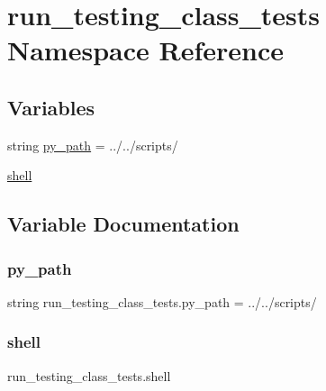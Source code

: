 \hypertarget{namespacerun__testing__class__tests}{}\section{run\+\_\+testing\+\_\+class\+\_\+tests Namespace Reference}
\label{namespacerun__testing__class__tests}
\subsection*{Variables}
\begin{DoxyCompactItemize}
\item 
string \hyperlink{namespacerun__testing__class__tests_adb8ad064c0b817b013e22c052fbc1a60}{py\+\_\+path} = \textquotesingle{}../../scripts/\textquotesingle{}
\item 
\hyperlink{namespacerun__testing__class__tests_a86332c96200dc5ef2e99580ea6b48ca9}{shell}
\end{DoxyCompactItemize}


\subsection{Variable Documentation}
\mbox{\label{namespacerun__testing__class__tests_adb8ad064c0b817b013e22c052fbc1a60}} 
\subsubsection{\texorpdfstring{py\+\_\+path}{py\_path}}
{\footnotesize\ttfamily string run\+\_\+testing\+\_\+class\+\_\+tests.\+py\+\_\+path = \textquotesingle{}../../scripts/\textquotesingle{}}

\mbox{\label{namespacerun__testing__class__tests_a86332c96200dc5ef2e99580ea6b48ca9}} 
\subsubsection{\texorpdfstring{shell}{shell}}
{\footnotesize\ttfamily run\+\_\+testing\+\_\+class\+\_\+tests.\+shell}

